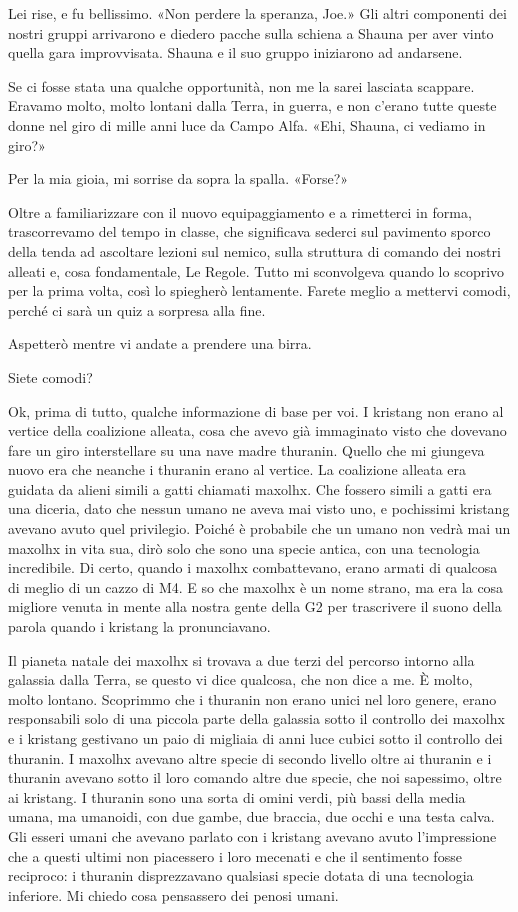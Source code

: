 Lei rise, e fu bellissimo. «Non perdere la speranza, Joe.» Gli altri
componenti dei nostri gruppi arrivarono e diedero pacche sulla schiena a
Shauna per aver vinto quella gara improvvisata. Shauna e il suo gruppo
iniziarono ad andarsene.

Se ci fosse stata una qualche opportunità, non me la sarei lasciata
scappare. Eravamo molto, molto lontani dalla Terra, in guerra, e non
c'erano tutte queste donne nel giro di mille anni luce da Campo Alfa.
«Ehi, Shauna, ci vediamo in giro?»

Per la mia gioia, mi sorrise da sopra la spalla. «Forse?»

\hfill\break

Oltre a familiarizzare con il nuovo equipaggiamento e a rimetterci in
forma, trascorrevamo del tempo in classe, che significava sederci sul
pavimento sporco della tenda ad ascoltare lezioni sul nemico, sulla
struttura di comando dei nostri alleati e, cosa fondamentale, Le Regole.
Tutto mi sconvolgeva quando lo scoprivo per la prima volta, così lo
spiegherò lentamente. Farete meglio a mettervi comodi, perché ci sarà un
quiz a sorpresa alla fine.

Aspetterò mentre vi andate a prendere una birra.

Siete comodi?

Ok, prima di tutto, qualche informazione di base per voi. I kristang non
erano al vertice della coalizione alleata, cosa che avevo già immaginato
visto che dovevano fare un giro interstellare su una nave madre
thuranin. Quello che mi giungeva nuovo era che neanche i thuranin erano
al vertice. La coalizione alleata era guidata da alieni simili a gatti
chiamati maxolhx. Che fossero simili a gatti era una diceria, dato che
nessun umano ne aveva mai visto uno, e pochissimi kristang avevano avuto
quel privilegio. Poiché è probabile che un umano non vedrà mai un
maxolhx in vita sua, dirò solo che sono una specie antica, con una
tecnologia incredibile. Di certo, quando i maxolhx combattevano, erano
armati di qualcosa di meglio di un cazzo di M4. E so che maxolhx è un
nome strano, ma era la cosa migliore venuta in mente alla nostra gente
della G2 per trascrivere il suono della parola quando i kristang la
pronunciavano.

Il pianeta natale dei maxolhx si trovava a due terzi del percorso
intorno alla galassia dalla Terra, se questo vi dice qualcosa, che non
dice a me. È molto, molto lontano. Scoprimmo che i thuranin non erano
unici nel loro genere, erano responsabili solo di una piccola parte
della galassia sotto il controllo dei maxolhx e i kristang gestivano un
paio di migliaia di anni luce cubici sotto il controllo dei thuranin. I
maxolhx avevano altre specie di secondo livello oltre ai thuranin e i
thuranin avevano sotto il loro comando altre due specie, che noi
sapessimo, oltre ai kristang. I thuranin sono una sorta di omini verdi,
più bassi della media umana, ma umanoidi, con due gambe, due braccia,
due occhi e una testa calva. Gli esseri umani che avevano parlato con i
kristang avevano avuto l'impressione che a questi ultimi non piacessero
i loro mecenati e che il sentimento fosse reciproco: i thuranin
disprezzavano qualsiasi specie dotata di una tecnologia inferiore. Mi
chiedo cosa pensassero dei penosi umani.

